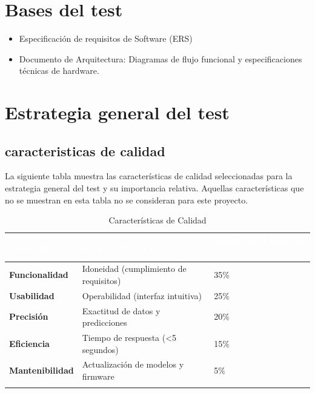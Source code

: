 \documentclass[12pt,a4paper, twosite]{article}
\begin{document}
\section{Bases del test}

\begin{itemize}
  \item Especificación de requisitos de Software (ERS)
  \item Documento de Arquitectura: Diagramas de flujo funcional y especificaciones técnicas de hardware.
\end{itemize}

\section{Estrategia general del test}

\subsection{caracteristicas de calidad}
La siguiente tabla muestra las características de calidad seleccionadas para la estrategia general del test y su importancia relativa. Aquellas características que no se muestran en esta tabla no se consideran para este proyecto.

\begin{longtable}{|p{5cm}|p{7cm}|p{3cm}|}
  \hline
  \cellcolor[HTML]{4472C4}\textcolor{white}{\textbf{Característica}} & \cellcolor[HTML]{4472C4}\textcolor{white}{\textbf{Subcaracterística}} & \cellcolor[HTML]{4472C4}\textcolor{white}{\textbf{Importancia Relativa (\%)}} \\ \hline
  \textbf{Funcionalidad}  & Idoneidad (cumplimiento de requisitos)  & 35\% \\ \hline
  \textbf{Usabilidad}     & Operabilidad (interfaz intuitiva)       & 25\% \\ \hline
  \textbf{Precisión}      & Exactitud de datos y predicciones       & 20\% \\ \hline
  \textbf{Eficiencia}     & Tiempo de respuesta (<5 segundos)       & 15\% \\ \hline
  \textbf{Mantenibilidad} & Actualización de modelos y firmware    & 5\%  \\ \hline
  \caption{Características de Calidad} \label{tab:caracteristicas_calidad} \\
\end{longtable}
\end{document}
